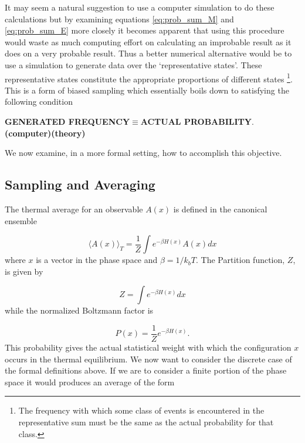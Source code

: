 \documentclass[a4paper]{article}
\newcommand{\bra}{\langle}
\newcommand{\ket}{\rangle}
\begin{document}
It may seem a natural suggestion to use a computer simulation to
do these calculations but by examining equations \eqref{eq:prob_sum_M} 
and \eqref{eq:prob_sum_E}
more closely it becomes apparent that using this procedure would waste as much
computing effort on calculating an improbable result as it does on a very 
probable result. Thus a better numerical alternative would be to use a
simulation to generate data over the `representative states'. These
representative states constitute the appropriate proportions of different states
\footnote{The frequency with which some class of events is encountered 
  in the representative sum must be the same as the actual probability
  for that class.}. This is a form of biased sampling which
essentially boils down to satisfying the following condition  
\vspace{1mm}
\begin{center}
  {\bf GENERATED FREQUENCY}{\bf $\equiv$}{\bf ACTUAL PROBABILITY}.
  {\bf \hspace{1cm}\vspace{1mm}(computer)\hspace{3.5cm}(theory)}
\end{center}We now examine, in a more formal setting, how to accomplish 
this objective.

\subsection{Sampling and Averaging}

The thermal average for an observable $A(x)$ is defined in the
canonical ensemble   

\begin{equation}
  \bra A(x) \ket_T = \frac{1}{Z} \int e^{-\beta H(x)} A(x)
  dx \label{eq:ensemble_average} 
\end{equation}
\noindent where $x$ is a vector in the phase space and $\beta=1/k_b T$. The Partition
function, $Z$, is given by

\begin{displaymath}
  Z = \int e^{-\beta H(x)} dx
\end{displaymath}
\noindent while the normalized Boltzmann factor is 

\begin{equation}
  P(x) = \frac{1}{Z} e^{-\beta H(x)}. \label{eq:normalized_boltz}
\end{equation}
This probability gives the actual statistical weight with which the
configuration $x$ occurs in the thermal equilibrium. We now want to
consider the discrete case of the formal definitions above. If we are
to consider a finite portion of the phase space it would produces an
average of the form   
\end{document}
